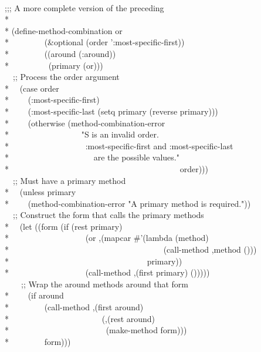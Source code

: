 \begin{defmac}
\begin{lisp}
\\
;;; A more complete version of the preceding \\*
\\*
(define-method-combination or  \\*
~~~~~~~~(\&optional (order ':most-specific-first)) \\*
~~~~~~~~((around (:around)) \\*
~~~~~~~~~(primary (or))) \\
~~;; Process the order argument \\*
~~(case order \\*
~~~~(:most-specific-first) \\*
~~~~(:most-specific-last (setq primary (reverse primary))) \\*
~~~~(otherwise (method-combination-error \\*
~~~~~~~~~~~~~~~~~"{\Xtilde}S is an invalid order.{\Xtilde}{\Xatsign} \\*
~~~~~~~~~~~~~~~~~~:most-specific-first and :most-specific-last {\Xtilde} \\*
~~~~~~~~~~~~~~~~~~~~are the possible values." \\*
~~~~~~~~~~~~~~~~~~~~~~~~~~~~~~~~~~~~~~~~~order))) \\
~~;; Must have a primary method \\*
~~(unless primary \\*
~~~~(method-combination-error "A primary method is required.")) \\
~~;; Construct the form that calls the primary methods \\*
~~(let ((form (if (rest primary) \\*
~~~~~~~~~~~~~~~~~~{\Xbq}(or ,{\Xatsign}(mapcar \#'(lambda (method) \\*
~~~~~~~~~~~~~~~~~~~~~~~~~~~~~~~~~~~~~{\Xbq}(call-method ,method ())) \\*
~~~~~~~~~~~~~~~~~~~~~~~~~~~~~~~~~primary)) \\*
~~~~~~~~~~~~~~~~~~{\Xbq}(call-method ,(first primary) ())))) \\
~~~~;; Wrap the around methods around that form \\*
~~~~(if around \\*
~~~~~~~~{\Xbq}(call-method ,(first around) \\*
~~~~~~~~~~~~~~~~~~~~~~(,{\Xatsign}(rest around) \\*
~~~~~~~~~~~~~~~~~~~~~~~(make-method form))) \\*
~~~~~~~~form)))
\end{lisp}

\end{defmac}
